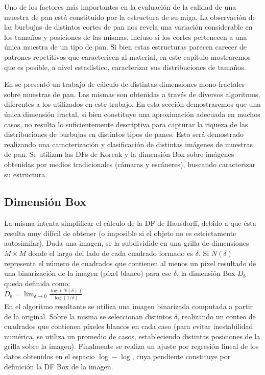 Uno de los factores más importantes en la evaluación de la calidad de una muestra de pan está constituido por la estructura de su miga.
La observación de las burbujas de distintos cortes de pan nos revela una variación considerable en los tamaños y posiciones de las mismas, incluso si los cortes pertenecen a una única muestra de un tipo de pan.
Si bien estas estructuras parecen carecer de patrones repetitivos que caractericen al material, en este capítulo mostraremos que es posible, a nivel estadístico, caracterizar sus distribuciones de tamaños.

En \cite{Gonzales2008} se present\'o un trabajo de c\'alculo de distintas dimensiones mono-fractales sobre muestras de pan.
Las mismas son obtenidas a trav\'es de diversos algoritmos, diferentes a los utilizados en este trabajo.
En esta sección demostraremos que una única dimensión fractal, si bien constituye una aproximación adecuada en muchos casos, no resulta lo suficientemente descriptiva para capturar la riqueza de las distribuciones de burbujas en distintos tipos de panes.
Esto será demostrado realizando una caracterización y clasificación de distintas imágenes de muestras de pan.
Se utilizan las DFs de Korcak \cite{Mandelbrot1983} y la dimensi\'on Box \cite{Peitgen2004} sobre imágenes obtenidas por medios tradicionales (cámaras y escáneres), buscando caracterizar su estructura.


\subsection{Dimensi\'on Box}
La misma intenta simplificar el c\'alculo de la DF de Hausdorff, debido a que \'esta resulta muy dif\'icil de obtener \cite{Peitgen2004} (o imposible si el objeto no es estrictamente autosimilar).
Dada una imagen, se la subdividide en una grilla de dimensiones $M\times M$ donde el largo del lado de cada cuadrado formado es $\delta$. Si $N(\delta)$ representa el n\'umero de cuadrados que contienen al menos un p\'ixel resultado de una binarizaci\'on de la imagen (p\'ixel blanco) para ese $\delta$, la dimensi\'on Box $D_{b}$ queda definida como:\\

$D_{b} = \displaystyle\lim_{\delta \to 0}{\frac{\log(N(\delta))}{\log (1/\delta)}}$\\

En el algoritmo resultante se utiliza una imagen binarizada computada a partir de la original. Sobre la misma se seleccionan distintos $\delta$, realizando un conteo de cuadrados que contienen p\'ixeles blancos en cada caso (para evitar inestabilidad num\'erica, se utiliza un promedio de casos, estableciendo distintas posiciones de la grilla sobre la imagen). Finalmente se realiza un ajuste por regresi\'on lineal de los datos obtenidos en el espacio $\log-\log$, cuya pendiente constituye por definici\'on la DF Box de la imagen.

